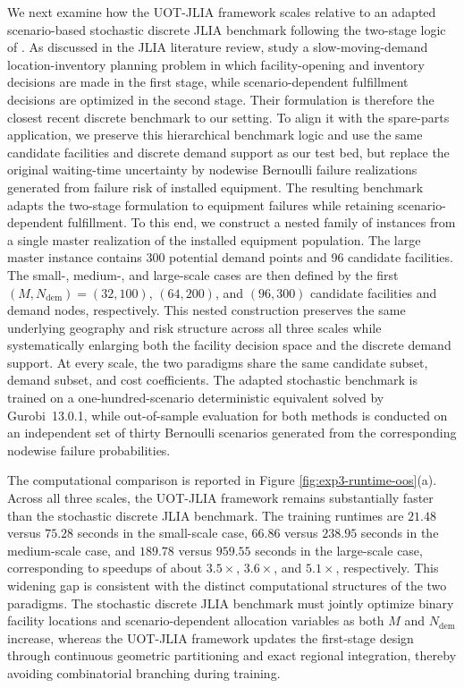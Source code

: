\documentclass[a4paper,fleqn]{cas-sc}
\theoremstyle{remark}
\theoremstyle{plain}
\begin{document}
We next examine how the UOT-JLIA framework scales relative to an adapted scenario-based stochastic discrete JLIA benchmark following the two-stage logic of \cite{chu2025integrated}. As discussed in the JLIA literature review, \citeauthor{chu2025integrated} study a slow-moving-demand location-inventory planning problem in which facility-opening and inventory decisions are made in the first stage, while scenario-dependent fulfillment decisions are optimized in the second stage. Their formulation is therefore the closest recent discrete benchmark to our setting. To align it with the spare-parts application, we preserve this hierarchical benchmark logic and use the same candidate facilities and discrete demand support as our test bed, but replace the original waiting-time uncertainty by nodewise Bernoulli failure realizations generated from failure risk of installed equipment. The resulting benchmark adapts the two-stage formulation to equipment failures while retaining scenario-dependent fulfillment. To this end, we construct a nested family of instances from a single master realization of the installed equipment population. The large master instance contains 300 potential demand points and 96 candidate facilities. The small-, medium-, and large-scale cases are then defined by the first $(M, N_{\mathrm{dem}})=(32,100)$, $(64,200)$, and $(96,300)$ candidate facilities and demand nodes, respectively. This nested construction preserves the same underlying geography and risk structure across all three scales while systematically enlarging both the facility decision space and the discrete demand support. At every scale, the two paradigms share the same candidate subset, demand subset, and cost coefficients. The adapted stochastic benchmark is trained on a one-hundred-scenario deterministic equivalent solved by Gurobi~13.0.1, while out-of-sample evaluation for both methods is conducted on an independent set of thirty Bernoulli scenarios generated from the corresponding nodewise failure probabilities.

The computational comparison is reported in Figure \ref{fig:exp3-runtime-oos}(a). Across all three scales, the UOT-JLIA framework remains substantially faster than the stochastic discrete JLIA benchmark. The training runtimes are $21.48$ versus $75.28$ seconds in the small-scale case, $66.86$ versus $238.95$ seconds in the medium-scale case, and $189.78$ versus $959.55$ seconds in the large-scale case, corresponding to speedups of about $3.5\times$, $3.6\times$, and $5.1\times$, respectively. This widening gap is consistent with the distinct computational structures of the two paradigms. The stochastic discrete JLIA benchmark must jointly optimize binary facility locations and scenario-dependent allocation variables as both $M$ and $N_{\mathrm{dem}}$ increase, whereas the UOT-JLIA framework updates the first-stage design through continuous geometric partitioning and exact regional integration, thereby avoiding combinatorial branching during training.
\end{document}
